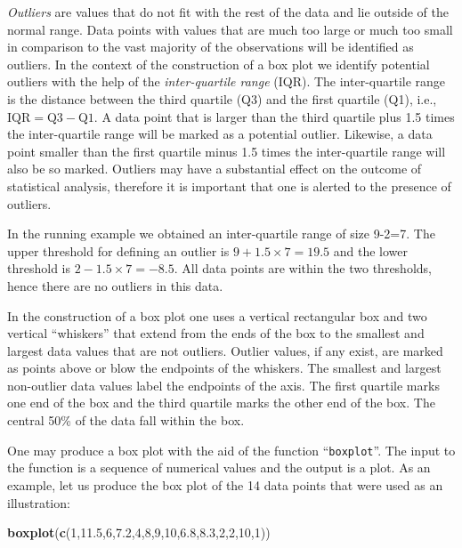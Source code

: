 \documentclass[]{krantz}
\makeatletter
\newenvironment{Shaded}{\begin{snugshade}}{\end{snugshade}}
\newcommand{\DecValTok}[1]{\textcolor[rgb]{0.00,0.00,0.81}{#1}}
\newcommand{\FloatTok}[1]{\textcolor[rgb]{0.00,0.00,0.81}{#1}}
\newcommand{\KeywordTok}[1]{\textcolor[rgb]{0.13,0.29,0.53}{\textbf{#1}}}
\newcommand{\NormalTok}[1]{#1}
\newenvironment{kframe}{%
\medskip{}
\setlength{\fboxsep}{.8em}
 \def\at@end@of@kframe{}%
 \ifinner\ifhmode%
  \def\at@end@of@kframe{\end{minipage}}%
  \begin{minipage}{\columnwidth}%
 \fi\fi%
 \def\FrameCommand##1{\hskip\@totalleftmargin \hskip-\fboxsep
 \colorbox{shadecolor}{##1}\hskip-\fboxsep
     \hskip-\linewidth \hskip-\@totalleftmargin \hskip\columnwidth}%
 \MakeFramed {\advance\hsize-\width
   \@totalleftmargin\z@ \linewidth\hsize
   \@setminipage}}%
 {\par\unskip\endMakeFramed%
 \at@end@of@kframe}
\renewenvironment{Shaded}{\begin{kframe}}{\end{kframe}}
\theoremstyle{definition}
\theoremstyle{definition}
\theoremstyle{definition}
\theoremstyle{remark}
\makeatother
\begin{document}
\emph{Outliers} are values that do not fit with the rest of the data and lie
outside of the normal range. Data points with values that are much too
large or much too small in comparison to the vast majority of the
observations will be identified as outliers. In the context of the
construction of a box plot we identify potential outliers with the help
of the \emph{inter-quartile range} (IQR). The inter-quartile range is the
distance between the third quartile (Q3) and the first quartile (Q1),
i.e., \(\mbox{IQR} = \mbox{Q3} - \mbox{Q1}\). A data point that is larger
than the third quartile plus 1.5 times the inter-quartile range will be
marked as a potential outlier. Likewise, a data point smaller than the
first quartile minus 1.5 times the inter-quartile range will also be so
marked. Outliers may have a substantial effect on the outcome of
statistical analysis, therefore it is important that one is alerted to
the presence of outliers.

In the running example we obtained an inter-quartile range of size
9-2=7. The upper threshold for defining an outlier is
\(9+1.5 \times 7 = 19.5\) and the lower threshold is
\(2-1.5 \times 7 = -8.5\). All data points are within the two thresholds,
hence there are no outliers in this data.

In the construction of a box plot one uses a vertical rectangular box
and two vertical ``whiskers'' that extend from the ends of the box to the
smallest and largest data values that are not outliers. Outlier values,
if any exist, are marked as points above or blow the endpoints of the
whiskers. The smallest and largest non-outlier data values label the
endpoints of the axis. The first quartile marks one end of the box and
the third quartile marks the other end of the box. The central 50\% of
the data fall within the box.

One may produce a box plot with the aid of the function ``\texttt{boxplot}''. The
input to the function is a sequence of numerical values and the output
is a plot. As an example, let us produce the box plot of the 14 data
points that were used as an illustration:

\begin{Shaded}
\begin{Highlighting}[]
\KeywordTok{boxplot}\NormalTok{(}\KeywordTok{c}\NormalTok{(}\DecValTok{1}\NormalTok{,}\FloatTok{11.5}\NormalTok{,}\DecValTok{6}\NormalTok{,}\FloatTok{7.2}\NormalTok{,}\DecValTok{4}\NormalTok{,}\DecValTok{8}\NormalTok{,}\DecValTok{9}\NormalTok{,}\DecValTok{10}\NormalTok{,}\FloatTok{6.8}\NormalTok{,}\FloatTok{8.3}\NormalTok{,}\DecValTok{2}\NormalTok{,}\DecValTok{2}\NormalTok{,}\DecValTok{10}\NormalTok{,}\DecValTok{1}\NormalTok{))}
\end{Highlighting}
\end{Shaded}
\end{document}
